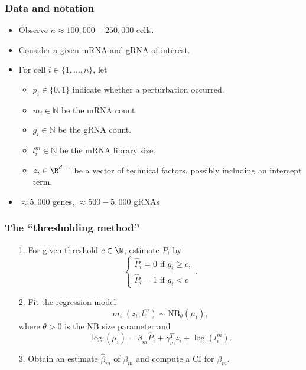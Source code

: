 \documentclass{beamer}
\begin{document}
\begin{frame}
\frametitle{Data and notation}

\begin{itemize}
\item Observe $n \approx 100,000 - 250,000$ cells.
\item Consider a given mRNA and gRNA of interest.
\item For cell $i \in \{1, \dots, n\}$, let 
\begin{itemize}
\item $p_i \in \{0, 1\}$ indicate whether a perturbation occurred. 
\item $m_i \in \mathbb{N}$ be the mRNA count.
\item $g_i \in \mathbb{N}$ be the gRNA count.
\item $l^m_i \in \mathbb{N}$ be the mRNA library size.
\item $z_i \in \R^{d-1}$ be a vector of technical factors, possibly including an intercept term.
\end{itemize}
\item $\approx5,000$ genes, $\approx500 - 5,000$ gRNAs
\end{itemize}
\end{frame}

\begin{frame}
\frametitle{The ``thresholding method''}

\begin{itemize}
\item[1.] For given threshold $c \in \N$, estimate $P_i$ by $$ \begin{cases} \hat{P}_i = 0 \textrm{ if } g_i \geq c, \\ \hat{P}_i = 1 \textrm{ if } g_i < c \end{cases}.$$
\item[2.] Fit the regression model \cite{Sarkar2021}
$$ m_i | \left( z_i, l^m_i \right) \sim \textrm{NB}_\theta(\mu_i),$$ where $\theta >0$ is the NB size parameter and $$\log\left(\mu_i\right) = \beta_m \hat{P}_i + \gamma^T_m z_i + \log\left( l_i^m\right).$$
\item[3.] Obtain an estimate $\hat{\beta}_m$ of $\beta_m$ and compute a CI for $\beta_m$.
\end{itemize}
\end{frame}
\end{document}
